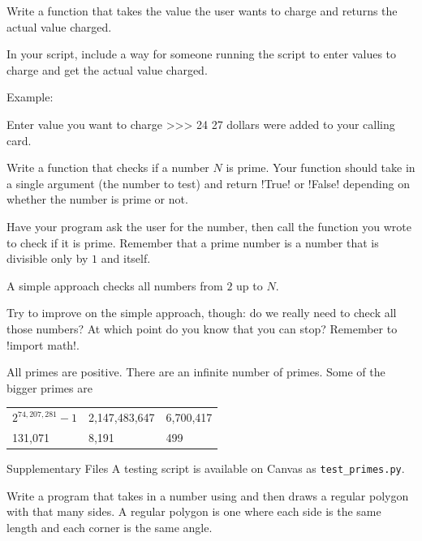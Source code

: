 \documentclass[11pt]{cselabheader}
\begin{document}
{\begin{ex}[calls.py]
    Write a function that takes the value the user wants to charge and returns
    the actual value charged.

    In your script, include a way for someone running the script to enter values
    to charge and get the actual value charged.

    Example:

    \begin{verbatimcode}
Enter value you want to charge >>> 24
27 dollars were added to your calling card.
    \end{verbatimcode}
\end{ex}


\begin{ex}[primes.py]
  Write a function that checks if a number $N$ is prime. Your function should
  take in a single argument (the number to test) and return \pythoninline!True!
  or \pythoninline!False! depending on whether the number is prime or not.

  Have your program ask the user for the number, then call the function you
  wrote to check if it is prime. Remember that a prime number is a
  number that is divisible only by $1$ and itself.

  A simple approach checks all numbers from $2$ up to $N$.

  Try to improve on the simple approach, though: do we really need to check
  all those numbers? At which point do you know that you can stop? Remember to
  \pythoninline!import math!.

  All primes are positive. There are an infinite number of primes. Some of the bigger primes are
  \begin{center}
  \begin{tabular}{lll}
    $2^{74,207,281} - 1$ & 2,147,483,647 & 6,700,417
    \\
    131,071 & 8,191 & 499
  \end{tabular}
  \end{center}

\end{ex}
\begin{infobox}{Supplementary Files}
A testing script is available on Canvas as \texttt{test\_primes.py}.
\end{infobox}

  \begin{ex}[polygons2.py] Write a program that takes in a number using
     and then draws a regular polygon with that many sides. A
    regular polygon is one where each side is the same length and each corner is
    the same angle.


\end{ex}}
\end{document}
